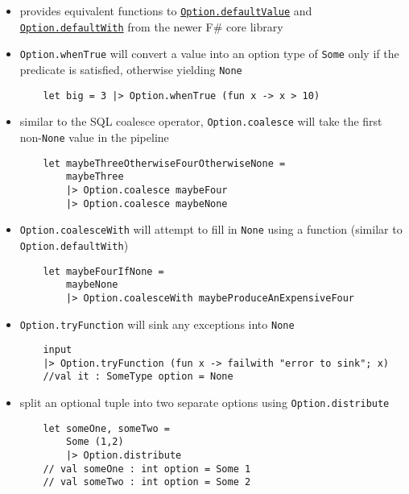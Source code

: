 \documentclass{article}
\begin{document}
\begin{itemize}
\item provides equivalent functions to \href{https://github.com/fsharp/fsharp/blob/1de369ca6f4564044ff6adee667a5da54f8b7138/src/fsharp/FSharp.Core/option.fs#L20}{\texttt{Option.defaultValue}} and \href{https://github.com/fsharp/fsharp/blob/1de369ca6f4564044ff6adee667a5da54f8b7138/src/fsharp/FSharp.Core/option.fs#L23}{\texttt{Option.defaultWith}} from the newer F\# core library

\item \texttt{Option.whenTrue} will convert a value into an option type of \texttt{Some} only if the predicate is satisfied, otherwise yielding \texttt{None}
\begin{verbatim}
    let big = 3 |> Option.whenTrue (fun x -> x > 10)
\end{verbatim}

\item similar to the SQL coalesce operator, \texttt{Option.coalesce} will take the first non-\texttt{None} value in the pipeline
\begin{verbatim}
    let maybeThreeOtherwiseFourOtherwiseNone =
        maybeThree
        |> Option.coalesce maybeFour
        |> Option.coalesce maybeNone
\end{verbatim}

\item \texttt{Option.coalesceWith} will attempt to fill in \texttt{None} using a function (similar to \texttt{Option.defaultWith})
\begin{verbatim}
    let maybeFourIfNone =
        maybeNone
        |> Option.coalesceWith maybeProduceAnExpensiveFour
\end{verbatim}

\item \texttt{Option.tryFunction} will sink any exceptions into \texttt{None}

\begin{verbatim}
    input
    |> Option.tryFunction (fun x -> failwith "error to sink"; x)
    //val it : SomeType option = None
\end{verbatim}

\item split an optional tuple into two separate options using \texttt{Option.distribute}
\begin{verbatim}
    let someOne, someTwo =
        Some (1,2)
        |> Option.distribute
    // val someOne : int option = Some 1
    // val someTwo : int option = Some 2
\end{verbatim}


\end{itemize}
\end{document}
